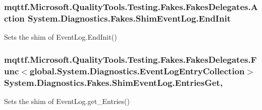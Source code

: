 \hypertarget{class_system_1_1_diagnostics_1_1_fakes_1_1_shim_event_log_a95442a40f9c02c70875f2b2199143b9a}{
\subsubsection[{End\-Init}]{\setlength{\rightskip}{0pt plus 5cm}mqttf.\-Microsoft.\-Quality\-Tools.\-Testing.\-Fakes.\-Fakes\-Delegates.\-Action System.\-Diagnostics.\-Fakes.\-Shim\-Event\-Log.\-End\-Init\hspace{0.3cm}{\ttfamily [set]}}}\label{class_system_1_1_diagnostics_1_1_fakes_1_1_shim_event_log_a95442a40f9c02c70875f2b2199143b9a}


Sets the shim of Event\-Log.\-End\-Init()

\hypertarget{class_system_1_1_diagnostics_1_1_fakes_1_1_shim_event_log_a5461a37e823bf3c5d2197ebaa567fcb9}{
\subsubsection[{Entries\-Get}]{\setlength{\rightskip}{0pt plus 5cm}mqttf.\-Microsoft.\-Quality\-Tools.\-Testing.\-Fakes.\-Fakes\-Delegates.\-Func$<$global.\-System.\-Diagnostics.\-Event\-Log\-Entry\-Collection$>$ System.\-Diagnostics.\-Fakes.\-Shim\-Event\-Log.\-Entries\-Get\hspace{0.3cm}{\ttfamily [get]}, {\ttfamily [set]}}}\label{class_system_1_1_diagnostics_1_1_fakes_1_1_shim_event_log_a5461a37e823bf3c5d2197ebaa567fcb9}


Sets the shim of Event\-Log.\-get\-\_\-\-Entries()

